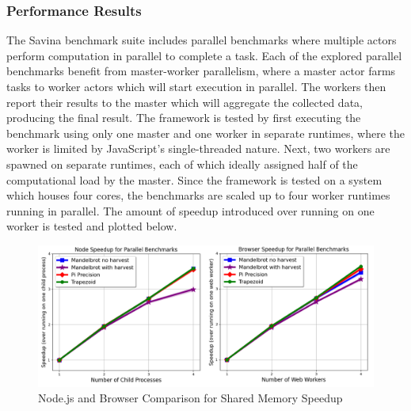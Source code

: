 \documentclass[12pt, a4paper]{report}
\theoremstyle{definition}
\theoremstyle{definition}%
\theoremstyle{definition}%
\theoremstyle{definition}%
\theoremstyle{definition}%
\theoremstyle{definition}%
\begin{document}
\subsubsection{Performance Results}
The Savina benchmark suite includes parallel benchmarks where multiple actors perform computation in parallel to complete a task. Each of the explored parallel benchmarks benefit from master-worker parallelism, where a master actor farms tasks to worker actors which will start execution in parallel. The workers then report their results to the master which will aggregate the collected data, producing the final result. The framework is tested by first executing the benchmark using only one master and one worker in separate runtimes, where the worker is limited by JavaScript's single-threaded nature.  Next, two workers are spawned on separate runtimes, each of which ideally assigned half of the computational load by the master. Since the framework is tested on a system which houses four cores, the benchmarks are scaled up to four worker runtimes running in parallel. The amount of speedup introduced over running on one worker is tested and plotted below.
\begin{figure}[H]
    \begin{centering}
        \includegraphics[width=\textwidth]{resources/shared_memory_speedup.png}
        \caption{Node.js and Browser Comparison for Shared Memory Speedup}
    \end{centering}
\end{figure}
\end{document}
